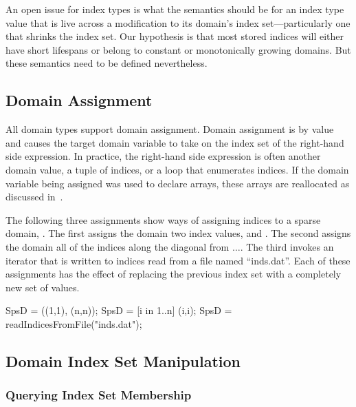 \begin{openissue}

An open issue for index types is what the semantics should be for an
index type value that is live across a modification to its domain's
index set---particularly one that shrinks the index set.  Our
hypothesis is that most stored indices will either have short
lifespans or belong to constant or monotonically growing domains.  But
these semantics need to be defined nevertheless.

\end{openissue}


\subsection{Domain Assignment}
\label{Domain_Assignment}

All domain types support domain assignment.  Domain assignment is by
value and causes the target domain variable to take on the index set
of the right-hand side expression.  In practice, the right-hand side
expression is often another domain value, a tuple of indices, or a
loop that enumerates indices.  If the domain variable being assigned
was used to declare arrays, these arrays are reallocated as discussed
in~.

\begin{example}
The following three assignments show ways of assigning indices to a
sparse domain, .  The first assigns the domain two index
values,  and .  The second assigns the domain
all of the indices along the diagonal from
$\ldots$.  The third invokes an iterator that
is written to  indices read from a file named
``inds.dat''.  Each of these assignments has the effect of replacing
the previous index set with a completely new set of values.
\begin{chapel}
SpsD = ((1,1), (n,n));
SpsD = [i in 1..n] (i,i);
SpsD = readIndicesFromFile("inds.dat");
\end{chapel}
\end{example}

\subsection{Domain Index Set Manipulation}
\label{Domain_Index_Set_Manipulation}

\subsubsection{Querying Index Set Membership}
\label{Domain_Membership}

